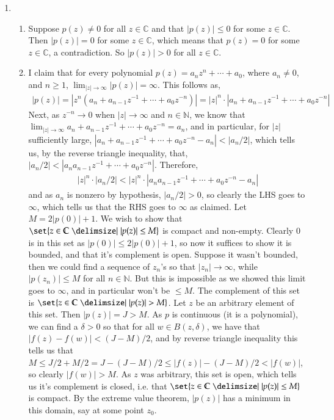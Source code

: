 \documentclass[12pt]{article}
\def\mbb#1{\mathbb{#1}}
\def\bN{\mbb{N}}
\theoremstyle{definition}
\theoremstyle{remark}
\newcommand{\C}{\mathbb{C}}
\begin{document}
\begin{enumerate}[leftmargin=\labelsep]
		\item 
		\begin{enumerate}[label=(\arabic*)]
			\item Suppose $p(z) \neq 0$ for all $z \in \C$ and that $|p(z)| \leq 0$ for some $z \in \C$. Then $|p(z)| = 0$ for some $z \in \C$, which means that $p(z) = 0$ for some $z \in \C$, a contradiction. So $|p(z)| > 0$ for all $z \in \C$.
			\item I claim that for every polynomial $p(z) = a_nz^n + \cdots + a_0$, where $a_n \neq 0$, and $n \geq 1$, $\lim_{|z| \to \infty} |p(z)| = \infty$. This follows as,
			\begin{align*}
				|p(z)| = |z^n(a_n + a_{n-1}z^{-1} + \cdots + a_0z^{-n})| = |z|^n \cdot |a_n + a_{n-1}z^{-1} + \cdots + a_0z^{-n}|
			\end{align*}
			Next, as $z^{-n} \to 0$ when $|z| \to \infty$ and $n \in \bN$, we know that $\lim_{|z| \to \infty} a_n + a_{n-1}z^{-1} + \cdots + a_0z^{-n} = a_n$, and in particular, for $|z|$ sufficiently large, $|a_n + a_{n-1}z^{-1} + \cdots + a_0z^{-n} - a_n| < |a_n/2|$, which tells us, by the reverse triangle inequality, that, $|a_n/2|<|a_n a_{n-1}z^{-1} + \cdots + a_0z^{-n}|$. Therefore, 
			\begin{align*}
				|z|^n \cdot |a_n/2| < |z|^n \cdot |a_n a_{n-1}z^{-1} + \cdots + a_0z^{-n} - a_n|
			\end{align*}
			and as $a_n$ is nonzero by hypothesis, $|a_n/2| > 0$, so clearly the LHS goes to $\infty$, which tells us that the RHS goes to $\infty$ as claimed. Let $M = 2|p(0)| + 1$. We wish to show that $\set{z \in \C \given |p(z)| \leq M}$ is compact and non-empty. Clearly $0$ is in this set as $|p(0)| \leq 2|p(0)| + 1$, so now it suffices to show it is bounded, and that it's complement is open. Suppose it wasn't bounded, then we could find a sequence of $z_n$'s so that $|z_n| \to \infty$, while $|p(z_n)| \leq M$ for all $n \in \bN$. But this is impossible as we showed this limit goes to $\infty$, and in particular won't be $\leq M$. The complement of this set is $\set{z \in \C \given |p(z)| > M}$. Let $z$ be an arbitrary element of this set. Then $|p(z)| =  J > M$. As $p$ is continuous (it is a polynomial), we can find a $\delta > 0$ so that for all $w \in B(z, \delta)$, we have that $|f(z) - f(w)| < (J-M) / 2$, and by reverse triangle inequality this tells us that $M \leq J/2 + M/2=J - (J-M)/2 \leq |f(z)| - (J-M) / 2 < |f(w)|$, so clearly $|f(w)| > M$. As $z$ was arbitrary, this set is open, which tells us it's complement is closed, i.e. that $\set{z \in \C \given |p(z)| \leq M}$ is compact. By the extreme value theorem, $|p(z)|$ has a minimum in this domain, say at some point $z_0$.
			

\end{enumerate}
\end{enumerate}
\end{document}
